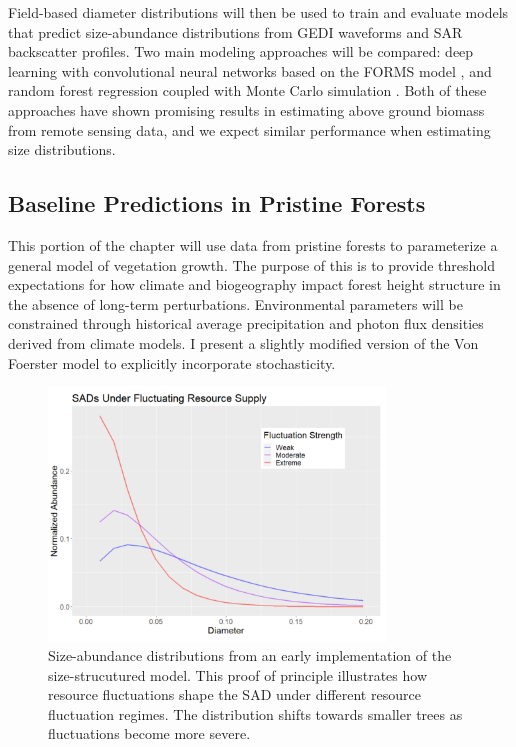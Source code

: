 Field-based diameter distributions will then be used to train and evaluate models that predict size-abundance distributions from GEDI waveforms and SAR backscatter profiles. Two main modeling approaches will be compared: deep learning with convolutional neural networks based on the FORMS model \cite{schwartz_forms_2023}, and random forest regression coupled with Monte Carlo simulation \cite{li_aboveground_2022}. Both of these approaches have shown promising results in estimating above ground biomass from remote sensing data, and we expect similar performance when estimating size distributions.

\subsection{Baseline Predictions in Pristine Forests}
\label{task2}

This portion of the chapter will use data from pristine forests to parameterize a general model of vegetation growth. The purpose of this is to provide threshold expectations for how climate and biogeography impact forest height structure in the absence of long-term perturbations. Environmental parameters will be constrained through historical average precipitation and photon flux densities derived from climate models. I present a slightly modified version of the Von Foerster model to explicitly incorporate stochasticity.

\begin{figure}[ht!]
    \centering
    \includegraphics[width=0.8\textwidth]{figures/SAD_fig.png} 
    \caption{Size-abundance distributions from an early implementation of the size-strucutured model. This proof of principle illustrates how resource fluctuations shape the SAD under different resource fluctuation regimes. The distribution shifts towards smaller trees as fluctuations become more severe.}
    \label{fig:SAD}
\end{figure} 

